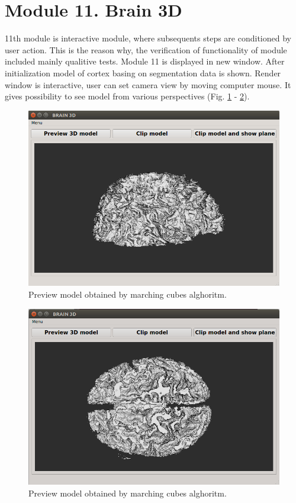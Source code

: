 \section{Module 11. Brain 3D}
\indent
11th module is interactive module, where subsequents steps are conditioned by user action. This is the reason why, the verification of functionality of module included mainly qualitive tests.
Module 11 is displayed in new window. After initialization model of cortex basing on segmentation data is shown. Render window is interactive, user can set camera view by moving computer mouse. It gives possibility to see model from various perspectives (Fig. \ref{fig:figures/11_test_1} - \ref{fig:figures/11_test_2}).  \\


\begin{figure}[H]
\centering{}\includegraphics[scale=0.7]{figures/Module_11/11_test_1.png}\caption{Preview model obtained by marching cubes alghoritm. \label{fig:figures/11_test_1}}
\end{figure}


\begin{figure}[H]
\centering{}\includegraphics[scale=0.7]{figures/Module_11/11_test_2.png}\caption{Preview model obtained by marching cubes alghoritm. \label{fig:figures/11_test_2}}
\end{figure}

